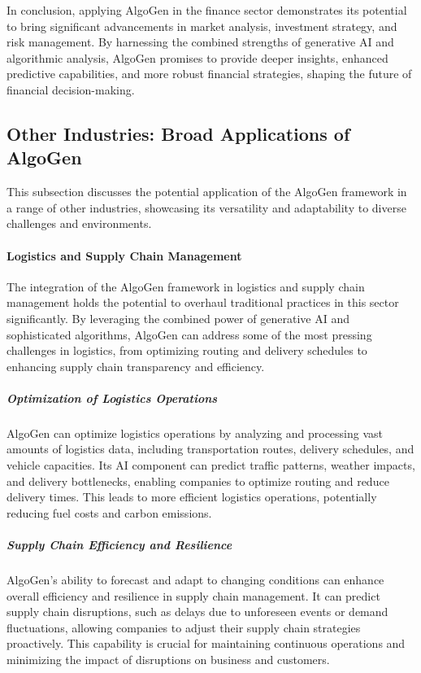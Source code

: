 \documentclass{article}
\begin{document}
In conclusion, applying AlgoGen in the finance sector demonstrates its potential to bring significant advancements in market analysis, investment strategy, and risk management. By harnessing the combined strengths of generative AI and algorithmic analysis, AlgoGen promises to provide deeper insights, enhanced predictive capabilities, and more robust financial strategies, shaping the future of financial decision-making.




\subsection{Other Industries: Broad Applications of AlgoGen}
This subsection discusses the potential application of the AlgoGen framework in a range of other industries, showcasing its versatility and adaptability to diverse challenges and environments.

\paragraph{Logistics and Supply Chain Management}
The integration of the AlgoGen framework in logistics and supply chain management holds the potential to overhaul traditional practices in this sector significantly. By leveraging the combined power of generative AI and sophisticated algorithms, AlgoGen can address some of the most pressing challenges in logistics, from optimizing routing and delivery schedules to enhancing supply chain transparency and efficiency.

\subparagraph{Optimization of Logistics Operations}
AlgoGen can optimize logistics operations by analyzing and processing vast amounts of logistics data, including transportation routes, delivery schedules, and vehicle capacities. Its AI component can predict traffic patterns, weather impacts, and delivery bottlenecks, enabling companies to optimize routing and reduce delivery times. This leads to more efficient logistics operations, potentially reducing fuel costs and carbon emissions.

\subparagraph{Supply Chain Efficiency and Resilience}
AlgoGen's ability to forecast and adapt to changing conditions can enhance overall efficiency and resilience in supply chain management. It can predict supply chain disruptions, such as delays due to unforeseen events or demand fluctuations, allowing companies to adjust their supply chain strategies proactively. This capability is crucial for maintaining continuous operations and minimizing the impact of disruptions on business and customers.
\end{document}
